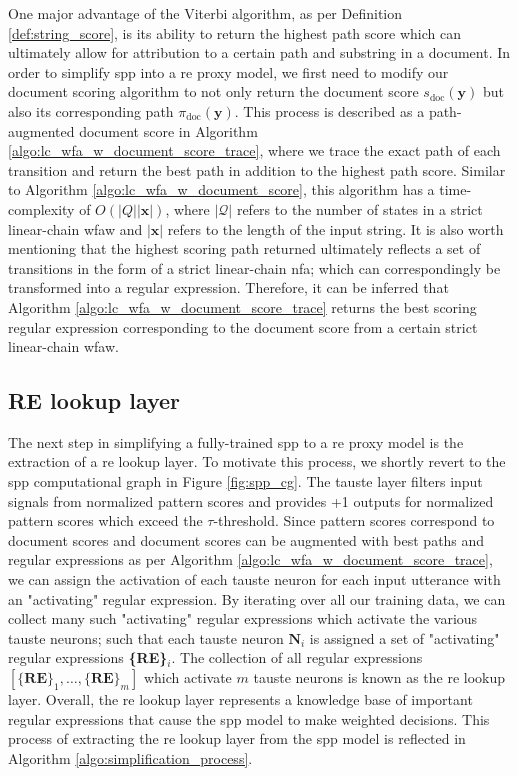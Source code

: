 One major advantage of the Viterbi algorithm, as per Definition
\ref{def:string_score}, is its ability to return the highest path score which
can ultimately allow for attribution to a certain path and substring in a
document. In order to simplify \ac{spp} into a \ac{re} proxy model, we first
need to modify our document scoring algorithm to not only return the document
score $s_{\text{doc}}(\bm{y})$ but also its corresponding path
$\pi_{\text{doc}}(\bm{y})$. This process is described as a path-augmented
document score in Algorithm \ref{algo:lc_wfa_w_document_score_trace}, where we
trace the exact path of each transition and return the best path in addition to
the highest path score. Similar to Algorithm \ref{algo:lc_wfa_w_document_score},
this algorithm has a time-complexity of $O(|Q||\bm{x}|)$, where $|\mathcal{Q}|$
refers to the number of states in a strict linear-chain \ac{wfaw} and $|\bm{x}|$
refers to the length of the input string. It is also worth mentioning that the
highest scoring path returned ultimately reflects a set of transitions in the
form of a strict linear-chain \ac{nfa}; which can correspondingly be transformed
into a regular expression. Therefore, it can be inferred that Algorithm
\ref{algo:lc_wfa_w_document_score_trace} returns the best scoring regular
expression corresponding to the document score from a certain strict
linear-chain \ac{wfaw}.

\subsection{RE lookup layer}

The next step in simplifying a fully-trained \ac{spp} to a \ac{re} proxy model is the
extraction of a \ac{re} lookup layer. To motivate this process, we shortly revert to
the \ac{spp} computational graph in Figure \ref{fig:spp_cg}. The \ac{tauste} layer
filters input signals from normalized pattern scores and provides +1 outputs for
normalized pattern scores which exceed the $\tau$-threshold. Since pattern
scores correspond to document scores and document scores can be augmented with
best paths and regular expressions as per Algorithm
\ref{algo:lc_wfa_w_document_score_trace}, we can assign the activation of each
\ac{tauste} neuron for each input utterance with an "activating" regular expression.
By iterating over all our training data, we can collect many such "activating"
regular expressions which activate the various \ac{tauste} neurons; such that each
\ac{tauste} neuron $\textbf{N}_i$ is assigned a set of "activating" regular expressions
\textbf{\{RE\}$_i$}. The collection of all regular expressions
$[\{\textbf{RE}\}_1, \ldots, \{\textbf{RE}\}_m]$ which activate $m$ \ac{tauste}
neurons is known as the \ac{re} lookup layer. Overall, the \ac{re} lookup layer represents
a knowledge base of important regular expressions that cause the \ac{spp} model to
make weighted decisions. This process of extracting the \ac{re} lookup layer from
the \ac{spp} model is reflected in Algorithm \ref{algo:simplification_process}.

